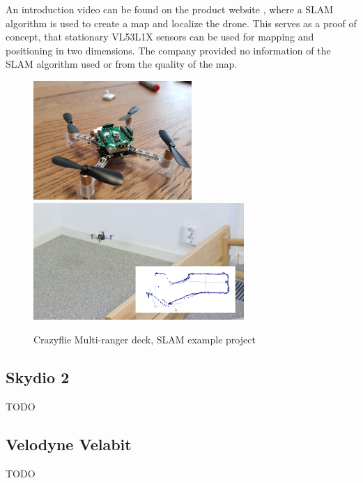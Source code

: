 An introduction video can be found on the product website \cite{BitcrazeMultirangerDeck}, where 
a SLAM algorithm is used to create a map and localize the drone. This serves as a proof of concept,
that stationary VL53L1X sensors can be used for mapping and positioning in two dimensions. The company provided 
no information of the SLAM algorithm used or from the quality of the map.
\newpage
\begin{figure}[h]
    \centering
    \includegraphics[width=60mm, keepaspectratio]{figures/multiranger_deck.jpg}
    \includegraphics[width=80mm, keepaspectratio]{figures/multiranger_slam.png}
    \caption{Crazyflie Multi-ranger deck, SLAM example project}
    \label{fig:crazyflie_multiranger}
\end{figure}



\subsection{Skydio 2}
TODO



\subsection{Velodyne Velabit}
TODO